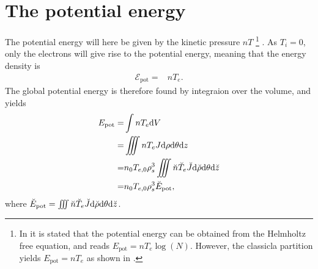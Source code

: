 %
\section{The potential energy}
%
The potential energy will here be given by the kinetic pressure $nT$
%
\footnote{In \cite{Wiesenberger2014} it is stated that the potential energy can be obtained from the Helmholtz free equation, and reads $E_{\text{pot}}=nT_e\log(N)$.
    However, the classicla partition yields $E_{\text{pot}}=nT_e$ as shown in \cite{Kittel1980book}.}%
.
As $T_i=0$, only the electrons will give rise to the potential energy, meaning that the energy density is
%
\begin{align*}
    \mathcal{E}_{\text{pot}} =& nT_e.
\end{align*}
%
The global potential energy is therefore found by integraion over the volume, and yields
%
\begin{align*}
    E_{\text{pot}}
    =& \int nT_e \text{d} V
    \\
    =& \iiint nT_e J \text{d}\rho \text{d}\theta \text{d} z
    \\
    =& n_0T_{e,0}\rho_s^3\iiint \breve{n}\breve{T}_e \breve{J} \text{d}\breve{\rho} \text{d}\theta \text{d} \breve{z}
    \\
    =& n_0T_{e,0}\rho_s^3\breve{E}_{\text{pot}},
\end{align*}
%
where $\breve{E}_{\text{pot}} = \iiint \breve{n}\breve{T}_e \breve{J} \text{d}\breve{\rho} \text{d}\theta \text{d} \breve{z}$.
